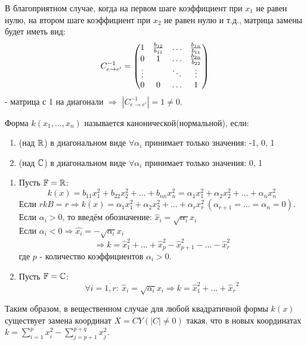 \begin{remark}
    В благоприятном случае, когда на первом шаге коэффициент при $x_1$ не равен нулю, на втором шаге коэффициент при $x_2$ не равен нулю и т.д., матрица замены будет иметь вид:
    $$C_{e\rightarrow e'}^{-1}=\begin{pmatrix}
    1 & \frac{b_{12}}{b_{11}} & \ldots & \frac{b_{1n}}{b_{11}}\\
    0 & 1 & \ldots & \frac{b_{2n}}{b_{22}}\\
    \vdots & \null & \ddots & \vdots\\
    0 & 0 & \ldots & 1
    \end{pmatrix}$$ 
    - матрица с 1 на диагонали $\Longrightarrow$ $|C_{e\rightarrow e'}^{-1}|=1\neq0$.
\end{remark}
\begin{definition}
    Форма $k(x_1,\ldots,x_n)$ называется канонической(нормальной), если:
    \begin{enumerate}
        \item (над $\mathbb{R}$) в диагональном виде $\forall \alpha_i$ принимает только значения: -1, 0, 1
        \item (над $\mathbb{C}$) в диагональном виде $\forall \alpha_i$ принимает только значения: 0, 1
    \end{enumerate}
\end{definition}
\begin{example}\tab
    \begin{enumerate}
        \item Пусть $\mathbb{F}=\mathbb{R}$:
        $$k(x)=b_{11}x_1^2+b_{22}x_2^2+\ldots+b_{nn}x_n^2 = \alpha_1x_1^2+\alpha_2x_2^2+\ldots+\alpha_nx_n^2$$
        Если $rkB=r \Longrightarrow  k(x)=\alpha_1x_1^2+\alpha_2x_2^2+\ldots+\alpha_rx_r^2 \ (\alpha_{r+1}=\ldots=\alpha_n=0)$.\\
        Если $\alpha_i>0$, то введём обозначение: $\widehat{x}_i=\sqrt{\alpha_i}x_i$ \\
        Если $\alpha_i < 0 \Longrightarrow  \widehat{x_i} = -\sqrt{\alpha_i}x_i$ 
        $$\Longrightarrow k=\widehat{x}_1^2+\ldots+\widehat{x}_p^2-\widehat{x}_{p+1}^2-\ldots-\widehat{x}_r^2$$
        где $p$ - количество коэффициентов $\alpha_i>0$.
        \item Пусть $\mathbb{F}=\mathbb{C}$: 
        $$\forall i=\overline{1,r}: \ \widehat{x}_i=\sqrt{\alpha_i}x_i \Longrightarrow k=\widehat{x}_1^2+\ldots+{\widehat{x}_r}^2$$
    \end{enumerate}
\end{example}
Таким образом, в вещественном случае для любой квадратичной формы $k(x)$ существует замена координат $X = CY (|C| \neq 0)$ такая, что в новых координатах $k = \sum \limits_{i=1}^p x_i^2 - \sum \limits_{j=p+1}^{p+q} x_j^2$.
